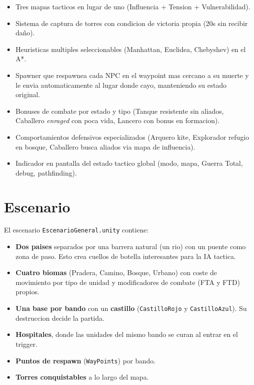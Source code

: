 \documentclass[12pt,a4paper]{article}
\begin{document}
\begin{itemize}[leftmargin=1.5em]
    \item Tres mapas tacticos en lugar de uno (Influencia + Tension + Vulnerabilidad).
    \item Sistema de captura de torres con condicion de victoria propia (20s sin recibir daño).
    \item Heuristicas multiples seleccionables (Manhattan, Euclidea, Chebyshev) en el A*.
    \item Spawner que respawnea cada NPC en el waypoint mas cercano a su muerte y le envia automaticamente al lugar donde cayo, manteniendo su estado original.
    \item Bonuses de combate por estado y tipo (Tanque resistente sin aliados, Caballero \emph{enraged} con poca vida, Lancero con bonus en formacion).
    \item Comportamientos defensivos especializados (Arquero kite, Explorador refugio en bosque, Caballero busca aliados via mapa de influencia).
    \item Indicador en pantalla del estado tactico global (modo, mapa, Guerra Total, debug, pathfinding).
\end{itemize}

\section{Escenario}

El escenario \texttt{EscenarioGeneral.unity} contiene:

\begin{itemize}[leftmargin=1.5em]
    \item \textbf{Dos paises} separados por una barrera natural (un rio) con un puente como zona de paso. Esto crea cuellos de botella interesantes para la IA tactica.
    \item \textbf{Cuatro biomas} (Pradera, Camino, Bosque, Urbano) con coste de movimiento por tipo de unidad y modificadores de combate (FTA y FTD) propios.
    \item \textbf{Una base por bando} con un \textbf{castillo} (\texttt{CastilloRojo} y \texttt{CastilloAzul}). Su destruccion decide la partida.
    \item \textbf{Hospitales}, donde las unidades del mismo bando se curan al entrar en el trigger.
    \item \textbf{Puntos de respawn} (\texttt{WayPoints}) por bando.
    \item \textbf{Torres conquistables} a lo largo del mapa.
\end{itemize}
\end{document}
